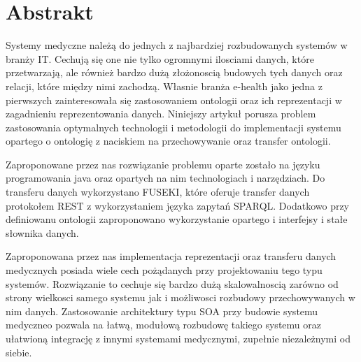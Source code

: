 \section{Abstrakt}
\label{sec:Abstrakt}

Systemy medyczne należą do jednych z najbardziej rozbudowanych systemów w branży IT. Cechują się one nie tylko ogromnymi ilosciami danych, które przetwarzają, ale również bardzo dużą złożonoscią budowych tych danych oraz relacji, które między nimi zachodzą. Własnie branża e-health jako jedna z pierwszych zainteresowała się zastosowaniem ontologii oraz ich reprezentacji w zagadnieniu reprezentowania danych. Niniejszy artykuł porusza problem zastosowania optymalnych technologii i metodologii do implementacji systemu opartego o ontologię z naciskiem na przechowywanie oraz transfer ontologii.

Zaproponowane przez nas rozwiązanie problemu oparte zostało na języku programowania java oraz opartych na nim technologiach i narzędziach. Do transferu danych wykorzystano FUSEKI, które oferuje transfer danych protokołem REST z wykorzystaniem języka zapytań SPARQL. Dodatkowo przy definiowanu ontologii zaproponowano wykorzystanie opartego i interfejsy i stałe słownika danych.

Zaproponowana przez nas implementacja reprezentacji oraz transferu danych medycznych posiada wiele cech pożądanych przy projektowaniu tego typu systemów. Rozwiązanie to cechuje się bardzo dużą skalowalnoscią zarówno od strony wielkosci samego systemu jak i możliwosci rozbudowy przechowywanych w nim danych. Zastosowanie architektury typu SOA przy budowie systemu medyczneo pozwala na łatwą, modułową rozbudowę takiego systemu oraz ułatwioną integrację z innymi systemami medycznymi, zupełnie niezależnymi od siebie.

